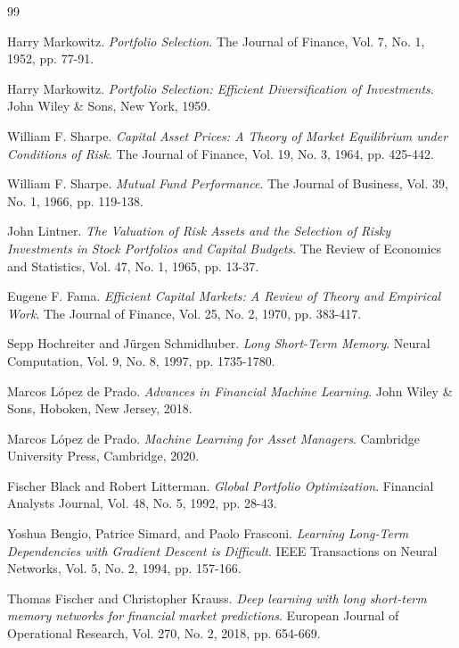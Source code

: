 \begin{thebibliography}{99}

Harry Markowitz.
\textit{Portfolio Selection}.
The Journal of Finance, Vol. 7, No. 1, 1952, pp. 77-91.

Harry Markowitz.
\textit{Portfolio Selection: Efficient Diversification of Investments}.
John Wiley \& Sons, New York, 1959.

William F. Sharpe.
\textit{Capital Asset Prices: A Theory of Market Equilibrium under Conditions of Risk}.
The Journal of Finance, Vol. 19, No. 3, 1964, pp. 425-442.

William F. Sharpe.
\textit{Mutual Fund Performance}.
The Journal of Business, Vol. 39, No. 1, 1966, pp. 119-138.

John Lintner.
\textit{The Valuation of Risk Assets and the Selection of Risky Investments in Stock Portfolios and Capital Budgets}.
The Review of Economics and Statistics, Vol. 47, No. 1, 1965, pp. 13-37.

Eugene F. Fama.
\textit{Efficient Capital Markets: A Review of Theory and Empirical Work}.
The Journal of Finance, Vol. 25, No. 2, 1970, pp. 383-417.

Sepp Hochreiter and Jürgen Schmidhuber.
\textit{Long Short-Term Memory}.
Neural Computation, Vol. 9, No. 8, 1997, pp. 1735-1780.

Marcos López de Prado.
\textit{Advances in Financial Machine Learning}.
John Wiley \& Sons, Hoboken, New Jersey, 2018.

Marcos López de Prado.
\textit{Machine Learning for Asset Managers}.
Cambridge University Press, Cambridge, 2020.

Fischer Black and Robert Litterman.
\textit{Global Portfolio Optimization}.
Financial Analysts Journal, Vol. 48, No. 5, 1992, pp. 28-43.

Yoshua Bengio, Patrice Simard, and Paolo Frasconi.
\textit{Learning Long-Term Dependencies with Gradient Descent is Difficult}.
IEEE Transactions on Neural Networks, Vol. 5, No. 2, 1994, pp. 157-166.

Thomas Fischer and Christopher Krauss.
\textit{Deep learning with long short-term memory networks for financial market predictions}.
European Journal of Operational Research, Vol. 270, No. 2, 2018, pp. 654-669.


\end{thebibliography}
